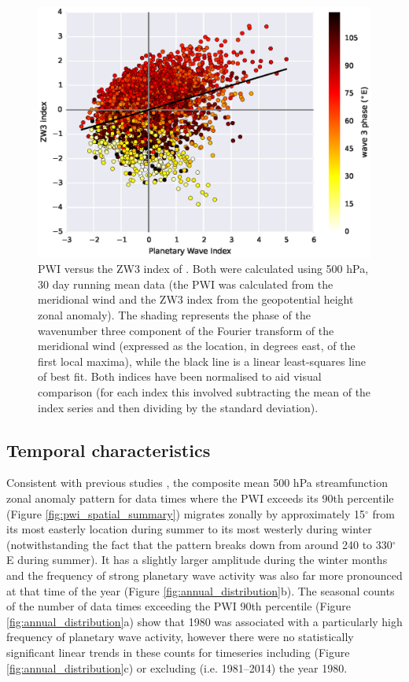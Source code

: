 \begin{figure}
\begin{center}
\includegraphics[width=0.8\columnwidth]{figures/zonalwaves/pwi-vs-zw3index_ERAInterim_500hPa_030day-runmean_native.eps}
\caption[PWI versus the ZW3 index of \citet{Raphael2004}]{\label{fig:metric_vs_zw3}
PWI versus the ZW3 index of \citet{Raphael2004}. Both were calculated using 500 hPa, 30 day running mean data (the PWI was calculated from the meridional wind and the ZW3 index from the geopotential height zonal anomaly). The shading represents the phase of the wavenumber three component of the Fourier transform of the meridional wind (expressed as the location, in degrees east, of the first local maxima), while the black line is a linear least-squares line of best fit. Both indices have been normalised to aid visual comparison (for each index this involved subtracting the mean of the index series and then dividing by the standard deviation).}
\end{center}
\end{figure}
    
\subsection{Temporal characteristics}

Consistent with previous studies \citep[e.g.][]{vanLoon1984,Mo1985}, the composite mean 500 hPa streamfunction zonal anomaly pattern for data times where the PWI exceeds its 90th percentile (Figure \ref{fig:pwi_spatial_summary}) migrates zonally by approximately 15$^{\circ}$ from its most easterly location during summer to its most westerly during winter (notwithstanding the fact that the pattern breaks down from around 240 to 330$^{\circ}$E during summer). It has a slightly larger amplitude during the winter months and the frequency of strong planetary wave activity was also far more pronounced at that time of the year (Figure \ref{fig:annual_distribution}b). The seasonal counts of the number of data times exceeding the PWI 90th percentile (Figure \ref{fig:annual_distribution}a) show that 1980 was associated with a particularly high frequency of planetary wave activity, however there were no statistically significant linear trends in these counts for timeseries including (Figure \ref{fig:annual_distribution}c) or excluding (i.e. 1981--2014) the year 1980.  


